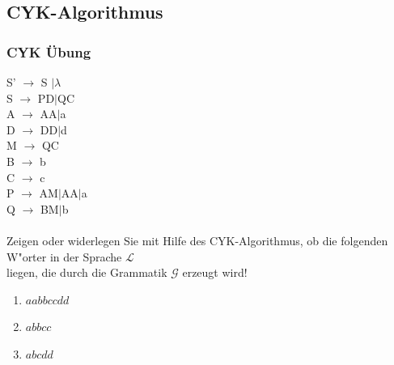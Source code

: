 \subsection{CYK-Algorithmus}
\begin{frame}
\frametitle{CYK Übung}

S' $\rightarrow$ S $| \lambda$~\\
S $\rightarrow$ PD$|$QC~\\
A $\rightarrow$ AA$|$a~\\
D $\rightarrow$ DD$|$d~\\
M $\rightarrow$ QC~\\
B $\rightarrow$ b~\\
C $\rightarrow$ c~\\
P $\rightarrow$ AM$|$AA$|$a~\\
Q $\rightarrow$ BM$|$b~\\~\\

Zeigen oder widerlegen Sie mit Hilfe des CYK-Algorithmus, ob die folgenden
		W"orter in der Sprache $\mathcal{L}$\\
		liegen, die durch die Grammatik $\mathcal{G}$ erzeugt wird!
		\begin{enumerate}
			\item $aabbccdd$
			\item $abbcc$
			\item $abcdd$
		\end{enumerate}
\end{frame}


